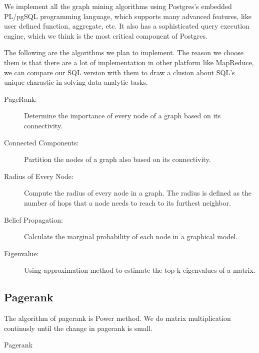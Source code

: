 We implement all the graph mining algorithms using Postgres's embedded PL/pgSQL programming language, which supports many advanced features, like user defined function, aggregate, etc. It also has a sophisticated query execution engine, which we think is the most critical component of Postgres.

The following are the algorithms we plan to implement. The reason we choose them is that there are a lot of implementation in other platform like MapReduce, we can compare our SQL version with them to draw a clusion about SQL's unique charastic in solving data analytic tasks.

\begin{description}
  \item[PageRank:] Determine the importance of every node of a graph based on its connectivity. 
  \item[Connected Components:] Partition the nodes of a graph also based on its connectivity.
  \item[Radius of Every Node:] Compute the radius of every node in a graph. The radius is defined as the number of hops that a node needs to reach to its furthest neighbor.
  \item[Belief Propagation:] Calculate the marginal probability of each node in a graphical model. 
  \item[Eigenvalue:] Using approximation method to estimate the top-k eigenvalues of a matrix.
\end{description}

\subsection{Pagerank}
The algorithm of pagerank is Power method. We do matrix multiplication continusly until the change in pagerank is small. 
\begin{algorithm}
\caption{Pagerank}
\begin{algorithmic}
\REPEAT
{}
\end{algorithmic}
\end{algorithm}

